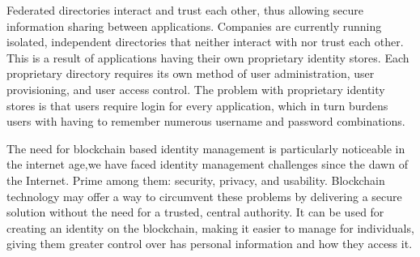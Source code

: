 Federated directories interact and trust each other, thus allowing secure information sharing between applications. Companies are currently running isolated, independent directories that neither interact with nor trust each other.
This is a result of applications having their own proprietary identity stores. Each
proprietary directory requires its own method of user administration, user
provisioning, and user access control. The problem with proprietary identity stores is that users require login for every application, which in turn burdens users with having to remember numerous username and password combinations.

The need for blockchain based identity management is particularly noticeable in the internet age,we have faced identity management challenges since the dawn of the Internet. Prime among them: security, privacy, and usability\citep{Blockchain}.
Blockchain technology may offer a way to circumvent these problems by delivering a secure solution without the need for a trusted, central authority. It can be used for creating an identity on the blockchain, making it easier to manage for individuals, giving them greater control over has personal information and how they access it.

